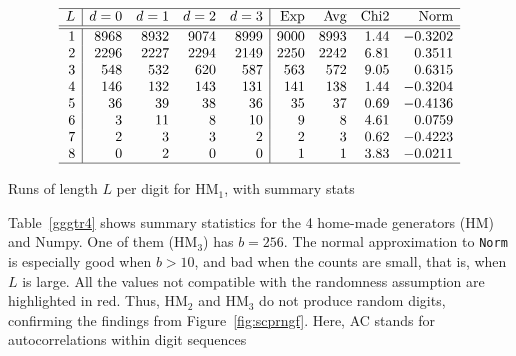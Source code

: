 \documentclass[oneside,10pt]{book}
\renewcommand{\arraystretch}{1.4} %
\begin{document}
\begin{table}[H]
\small
\setlength\extrarowheight{-1pt}
\[
\begin{array}{r|rrrr|rrrr}
\hline
L&      d=0&      d=1&      d=2&      d=3&      \text{Exp}&      \text{Avg}&     \text{Chi2}&     \text{Norm}\\
\hline
\hline
1&     8968&     8932&     9074&     8999&     9000&     8993&     1.44&  -0.3202\\
2&     2296&     2227&     2294&     2149&     2250&     2242&     6.81&   0.3511\\
3&      548&      532&      620&      587&      563&      572&     9.05&   0.6315\\
4&      146&      132&      143&      131&      141&      138&     1.44&  -0.3204\\
5&       36&       39&       38&       36&       35&       37&     0.69&  -0.4136\\
6&        3&       11&        8&       10&        9&        8&     4.61&   0.0759\\
7&        2&        3&        3&        2&        2&        3&     0.62&  -0.4223\\
8&        0&        2&        0&        0&        1&        1&     3.83&  -0.0211\\
\hline
\end{array}
\]
\caption{\label{gghuh42s}Runs of length $L$ per digit for HM$_1$, with summary stats}
\end{table}

Table~\ref{gggtr4} shows  summary statistics for the 4 home-made generators (HM) and Numpy. One of them (HM$_3$) has $b=256$. 
The normal approximation to \texttt{Norm} is especially good when $b > 10$, and bad when the counts are small, that is, when $L$ is large.
All the values not compatible with the randomness assumption are highlighted in red. Thus, HM$_2$ and HM$_3$ do not produce random
 digits, confirming the findings from Figure~\ref{fig:scprngf}. Here, AC stands for autocorrelations within digit sequences 
\end{document}
